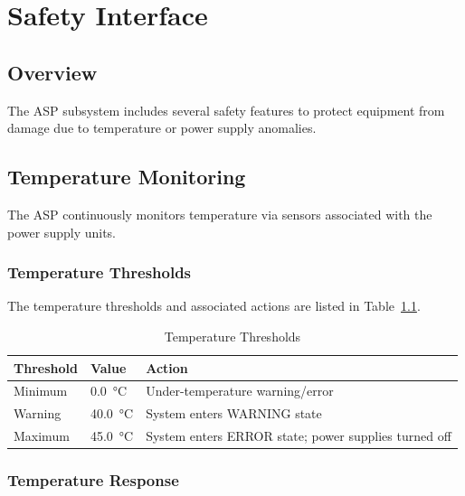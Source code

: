 
\chapter{Safety Interface}
\label{sec:safety}

\section{Overview}

The ASP subsystem includes several safety features to protect equipment from damage due to temperature or power supply anomalies.

\section{Temperature Monitoring}

The ASP continuously monitors temperature via sensors associated with the power supply units.

\subsection{Temperature Thresholds}

The temperature thresholds and associated actions are listed in Table~\ref{tab:temp-thresholds}.

\begin{table}[htbp]
    \centering
    \caption{Temperature Thresholds}
    \label{tab:temp-thresholds}
    \begin{tabular}{lll}
        \toprule
        \textbf{Threshold} & \textbf{Value} & \textbf{Action} \\
        \midrule
        Minimum & \SI{0.0}{\degreeCelsius} & Under-temperature warning/error \\
        Warning & \SI{40.0}{\degreeCelsius} & System enters WARNING state \\
        Maximum & \SI{45.0}{\degreeCelsius} & System enters ERROR state; power supplies turned off \\
        \bottomrule
    \end{tabular}
\end{table}

\subsection{Temperature Response}

